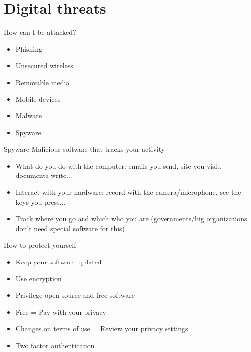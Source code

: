 \documentclass[11pt]{beamer}
\begin{document}
\section{Digital threats}
\begin{frame}{How can I be attacked?}
\begin{itemize}
\item Phishing
\item Unsecured wireless
\item Removable media
\item Mobile devices
\item Malware
\item Spyware
\end{itemize}
\end{frame}
\begin{frame}{Spyware}
Malicious software that tracks your activity
\begin{itemize}
\item What do you do with the computer: emails you send, site you visit, documents write...
\item Interact with your hardware: record with the camera/microphone, see the keys you press...
\item Track where you go and which who you are (governments/big organizations don't need special software for this)
\end{itemize}
\end{frame}
\begin{frame}{How to protect yourself}
\begin{itemize}
\item Keep your software updated
\item Use encryption
\item Privilege open source and free software
\item Free = Pay with your privacy
\item Changes on terms of use = Review your privacy settings
\item Two factor authentication
\end{itemize}
\end{frame}
\end{document}

